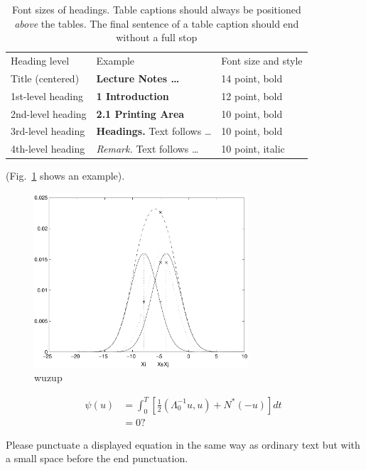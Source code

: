 \documentclass[runningheads]{llncs}
\begin{document}
\setlength{\tabcolsep}{4pt}
\begin{table}
\begin{center}
\caption{Font sizes of headings. Table captions should always be
positioned {\it above} the tables. The final sentence of a table
caption should end without a full stop}
\label{table:headings}
\begin{tabular}{lll}
\hline\noalign{\smallskip}
Heading level & Example & Font size and style\\
\noalign{\smallskip}
\hline
\noalign{\smallskip}
Title (centered)  & {\Large \bf Lecture Notes \dots} & 14 point, bold\\
1st-level heading & {\large \bf 1 Introduction} & 12 point, bold\\
2nd-level heading & {\bf 2.1 Printing Area} & 10 point, bold\\
3rd-level heading & {\bf Headings.} Text follows \dots & 10 point, bold
\\
4th-level heading & {\it Remark.} Text follows \dots & 10 point,
italic\\
\hline
\end{tabular}
\end{center}
\end{table}
\setlength{\tabcolsep}{1.4pt}

(Fig.~\ref{fig:example} shows an example).
\begin{figure}
\centering
\includegraphics[height=6.5cm]{figures/eijkel2}
\caption{wuzup}
\label{fig:example}
\end{figure}


\begin{align}
  \psi (u) & = \int_{0}^{T} \left[\frac{1}{2}
  \left(\Lambda_{0}^{-1} u,u\right) + N^{\ast} (-u)\right] dt \; \\
& = 0 ?
\end{align}

Please punctuate a displayed equation in the same way as ordinary
text but with a small space before the end punctuation.
\end{document}
